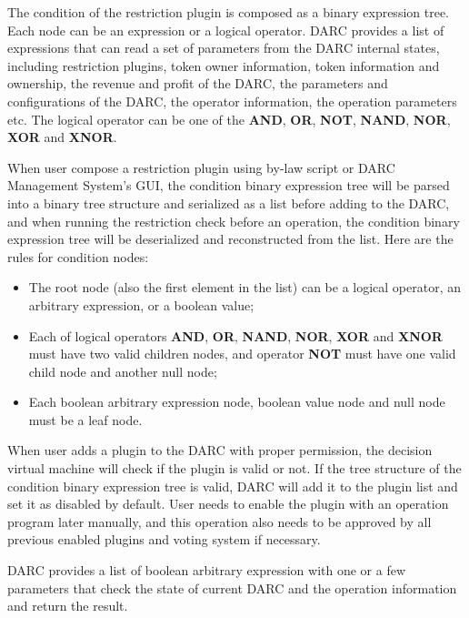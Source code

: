 \documentclass[main.tex]{subfiles}
\begin{document}
The condition of the restriction plugin is composed as a binary expression tree. Each node can be an expression or a logical operator. DARC provides a list of expressions that can read a set of parameters from the DARC internal states, including restriction plugins, token owner information, token information and ownership, the revenue and profit of the DARC, the parameters and configurations of the DARC, the operator information, the operation parameters etc. The logical operator can be one of the \textbf{AND}, \textbf{OR}, \textbf{NOT}, \textbf{NAND}, \textbf{NOR}, \textbf{XOR} and \textbf{XNOR}.

When user compose a restriction plugin using by-law script or DARC Management System's GUI, the condition binary expression tree will be parsed into a binary tree structure and serialized as a list before adding to the DARC, and when running the restriction check before an operation, the condition binary expression tree will be deserialized and reconstructed from the list. Here are the rules for condition nodes:

\begin{itemize}
    \item The root node (also the first element in the list) can be a logical operator, an arbitrary expression, or a boolean value;
    \item Each of logical operators \textbf{AND}, \textbf{OR}, \textbf{NAND}, \textbf{NOR}, \textbf{XOR} and \textbf{XNOR} must have two valid children nodes, and operator \textbf{NOT} must have one valid child node and another null node;
    \item Each boolean arbitrary expression node, boolean value node and null node must be a leaf node.
\end{itemize}

When user adds a plugin to the DARC with proper permission, the decision virtual machine will check if the plugin is valid or not. If the tree structure of the condition binary expression tree is valid, DARC will add it to the plugin list and set it as disabled by default. User needs to enable the plugin with an operation program later manually, and this operation also needs to be approved by all previous enabled plugins and voting system if necessary.

DARC provides a list of boolean arbitrary expression with one or a few parameters that check the state of current DARC and the operation information and return the result. 
\end{document}
